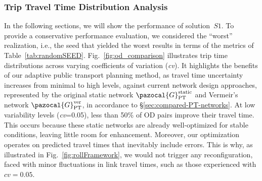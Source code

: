 \documentclass[a4paper,fleqn]{cas-sc}
\begin{document}

\subsubsection{Trip Travel Time Distribution Analysis}

In the following sections, we will show the performance of solution~$S1$. To provide a conservative performance evaluation, we considered the ``worst'' realization, i.e., the seed that yielded the worst results in terms of the metrics of Table~\ref{tab:randomSEED}.
Fig.~\ref{fig:od_comparison} illustrates trip time distributions across varying coefficients of variation (\textit{cv}). It highlights the benefits of our adaptive public transport planning method, as travel time uncertainty increases from minimal to high levels, against current network design approaches, represented by the original static network $\pazocal{G}_{\text{PT}}^{\text{static}}$ and Vermeir's network $\pazocal{G}_{\text{PT}}^{\text{ver}}$, in accordance to \S{}\ref{sec:compared-PT-networks}.
%
At low variability levels (\textit{cv}=0.05), less than 50\% of OD pairs improve their travel time. This occurs because these static networks are already well-optimized for stable conditions, leaving little room for enhancement. 
%
Moreover, our optimization operates on predicted travel times that inevitably include errors. This is why, as illustrated in Fig.~\ref{fig:rollFramework}, we would not trigger any reconfiguration, faced with minor fluctuations in link travel times, such as those experienced with $\textit{cv}=0.05$.
\end{document}
